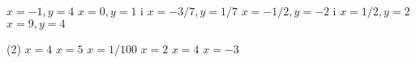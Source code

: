 \documentclass[11pt, a4paper, pdf]{article}
\begin{document}
\begin{multicols}{2}
\begin{mylist}
 
 \item 
 \begin{tasks}
 	\task  $x=-1, y=4$
 	\task $x=0, y=1$ i $x=-3/7, y=1/7$
 	\task $x=-1/2, y=-2$ i $x=1/2, y=2$
 	\task $x=9, y=4$
 \end{tasks}

 	\item
\begin{tasks}(2)
	\task $x=4$
	\task $x=5$
	\task $x=1/100$
	\task $x=2$
	\task $x=4$
	\task $x=-3$
\end{tasks}

 

\end{mylist}

\end{multicols}
\end{document}
